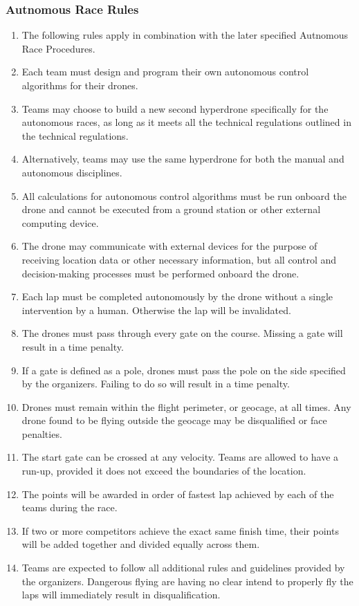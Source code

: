     \subsubsection{Autnomous Race Rules}
    \begin{enumerate}
    \item The following rules apply in combination with the later specified Autnomous Race Procedures.
    \item Each team must design and program their own autonomous control algorithms for their drones.
    \item Teams may choose to build a new second hyperdrone specifically for the autonomous races, as long as it meets all the technical regulations outlined in the technical regulations.
    \item Alternatively, teams may use the same hyperdrone for both the manual and autonomous disciplines.
    \item All calculations for autonomous control algorithms must be run onboard the drone and cannot be executed from a ground station or other external computing device.
    \item The drone may communicate with external devices for the purpose of receiving location data or other necessary information, but all control and decision-making processes must be performed onboard the drone.
    \item Each lap must be completed autonomously by the drone without a single intervention by a human. Otherwise the lap will be invalidated.
    \item The drones must pass through every gate on the course. Missing a gate will result in a time penalty.
    \item If a gate is defined as a pole, drones must pass the pole on the side specified by the organizers. Failing to do so will result in a time penalty.
    \item Drones must remain within the flight perimeter, or geocage, at all times. Any drone found to be flying outside the geocage may be disqualified or face penalties.
    \item The start gate can be crossed at any velocity. Teams are allowed to have a run-up, provided it does not exceed the boundaries of the location.
    \item The points will be awarded in order of fastest lap achieved by each of the teams during the race.
    \item If two or more competitors achieve the exact same finish time, their points will be added together and divided equally across them.
    \item Teams are expected to follow all additional rules and guidelines provided by the organizers. Dangerous flying are having no clear intend to properly fly the laps will immediately result in disqualification.
    \end{enumerate}

